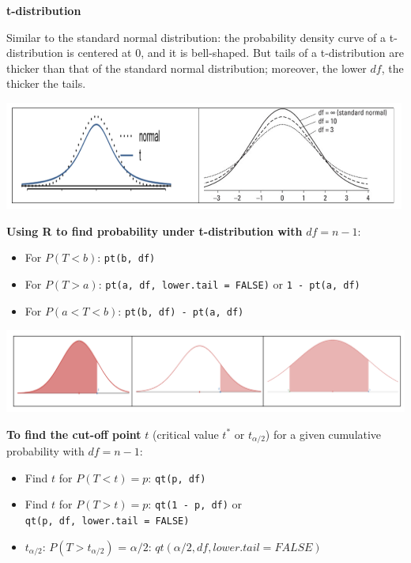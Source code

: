 \documentclass[
]{book}
\providecommand{\tightlist}{%
  \setlength{\itemsep}{0pt}\setlength{\parskip}{0pt}}
\begin{document}
\textbf{t-distribution}

Similar to the standard normal distribution: the probability density curve of a t-distribution is centered at 0, and it is bell-shaped. But tails of a t-distribution are thicker than that of the standard normal distribution; moreover, the lower \(df\), the thicker the tails.

\includegraphics[width=5.20833in,height=\textheight]{images/img52.png}

\textbf{Using R to find probability under t-distribution with} \(df=n-1\):

\begin{itemize}
\tightlist
\item
  For \(P(T < b)\): \texttt{pt(b,\ df)}
\item
  For \(P(T > a)\): \texttt{pt(a,\ df,\ lower.tail\ =\ FALSE)} or \texttt{1\ -\ pt(a,\ df)}
\item
  For \(P(a < T < b)\): \texttt{pt(b,\ df)\ -\ pt(a,\ df)}
\end{itemize}

\includegraphics[width=5.72917in,height=\textheight]{images/img53.png}

\textbf{To find the cut-off point} \(t\) (critical value \(t^*\) or \(t_{\alpha/2}\)) for a given cumulative probability with \(df=n-1\):

\begin{itemize}
\tightlist
\item
  Find \(t\) for \(P(T < t) = p\): \texttt{qt(p,\ df)}
\item
  Find \(t\) for \(P(T > t) = p\): \texttt{qt(1\ -\ p,\ df)} or \texttt{qt(p,\ df,\ lower.tail\ =\ FALSE)}
\item
  \(t_{\alpha/2}\): \(P(T > t_{\alpha/2})\) = \(\alpha/2\): \(qt(\alpha/2, df, lower.tail = FALSE)\)
\end{itemize}
\end{document}
